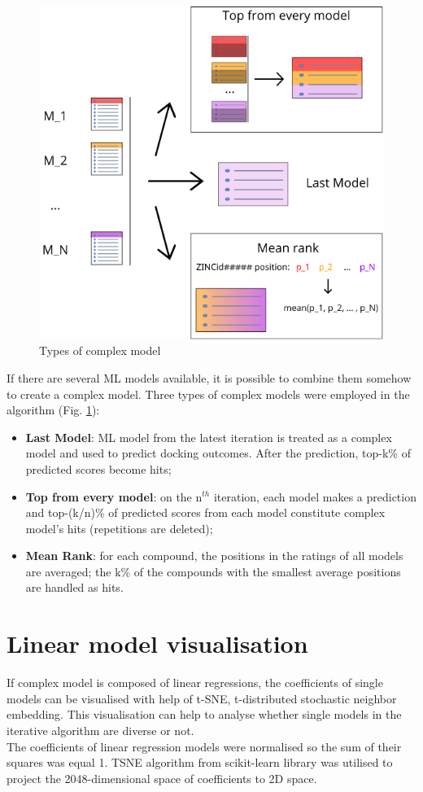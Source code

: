 \begin{figure}
    \centering
    \includegraphics[scale=0.8]{Images/image2.png}
    \caption{Types of complex model}
    \label{ComplexModels}
\end{figure}

If there are several ML models available, it is possible to combine them somehow 
to create a complex model.
Three types of complex models were employed in the algorithm (Fig. \ref{ComplexModels}):
\begin{itemize}
    \item \textbf{Last Model}: ML model from the latest iteration is treated as a complex model and used to predict docking outcomes.
    After the prediction, top-k\% of predicted scores become hits;
    \item \textbf{Top from every model}: on the $\text{n}^{th}$ iteration, each model makes a prediction and top-(k/n)\% of predicted scores from each model constitute complex model's hits (repetitions are deleted);
    \item \textbf{Mean Rank}: for each compound, the positions in the ratings of all models are averaged; the k\% of the compounds with the smallest average positions are handled as hits.
\end{itemize}


\section{Linear model visualisation}
If complex model is composed of linear regressions, the coefficients of single models 
can be visualised with help of t-SNE, t-distributed stochastic neighbor embedding.
This visualisation can help to analyse whether single models in the iterative algorithm 
are diverse or not. \\

The coefficients of linear regression models were normalised so the sum of their 
squares was equal 1.
TSNE algorithm from scikit-learn library was utilised to project the 2048-dimensional 
space of coefficients to 2D space. 

